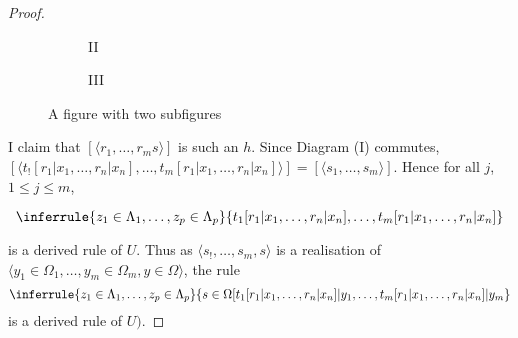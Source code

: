 \begin{proof}
    \begin{figure}
    \centering
    \begin{subfigure}{.5\textwidth}
      \centering
      \caption{II}
      \label{diag:2.7-II}
    \end{subfigure}%
    \begin{subfigure}{.5\textwidth}
      \centering
      \caption{III}
      \label{diag:2.7-II}
    \end{subfigure}
    \caption{A figure with two subfigures}
    \label{fig:test}
  \end{figure}

  I claim that \([\langle r_1, \ldots, r_m s \rangle]\) is such an \(h\).
  Since Diagram (I) commutes, \([\langle t_![r_1|x_1, \ldots, r_n|x_n], \ldots, t_m[r_1|x_1, \ldots, r_n|x_n] \rangle] = [\langle s_1,\ldots, s_m \rangle]\).
  Hence for all \(j\), \(1 \leq j \leq m\),

  \[
    \inferrule{z_1 \in \Lambda_1, \ldots, z_p \in \Lambda_p}{t_1[r_1|x_1, \ldots, r_n|x_n], \ldots, t_m[r_1|x_1, \ldots, r_n|x_n]}
  \]

  is a derived rule of \(U\).
  Thus as \(\langle  s_!, \ldots, s_m, s \rangle\) is a realisation of \(\langle y_1 \in \Omega_1, \ldots, y_m \in \Omega_m, y \in \Omega \rangle\), the rule 
  \[
    \inferrule{z_1 \in \Lambda_1, \ldots, z_p \in \Lambda_p}{s \in \Omega [t_1[r_1|x_1, \ldots, r_n|x_n]|y_1, \ldots, t_m[r_1|x_1, \ldots, r_n|x_n]|y_m}
  \]
  is a derived rule of \(U)\).
\end{proof}











